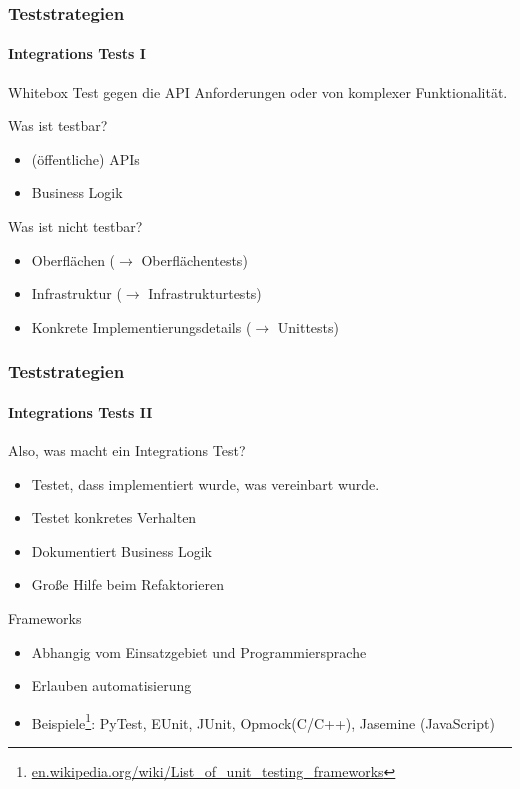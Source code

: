 \begin{frame}
  \frametitle{Teststrategien}
  \framesubtitle{Integrations Tests I}
  Whitebox Test gegen die API Anforderungen oder von komplexer Funktionalität.
  \pause
  \begin{block}{Was ist testbar?}
    \pause
    \begin{itemize}
    \item (öffentliche) APIs
      \pause
    \item Business Logik
      \pause
    \end{itemize}
  \end{block}

  \pause
  \begin{block}{Was ist nicht testbar?}
    \pause
    \begin{itemize}
      \item Oberflächen ($\rightarrow$ Oberflächentests)
        \pause
      \item Infrastruktur ($\rightarrow$ Infrastrukturtests)
        \pause
      \item Konkrete Implementierungsdetails ($\rightarrow$ Unittests)
    \end{itemize}
  \end{block}
\end{frame}

\begin{frame}
  \frametitle{Teststrategien}
  \framesubtitle{Integrations Tests II}

  \begin{block}{Also, was macht ein Integrations Test?}
    \pause
    \begin{itemize}
      \item Testet, dass implementiert wurde, was vereinbart wurde.
        \pause
      \item Testet konkretes Verhalten
        \pause
      \item Dokumentiert Business Logik
        \pause
      \item Große Hilfe beim Refaktorieren
    \end{itemize}
  \end{block}

  \pause

  \begin{block}{Frameworks}
    \pause
    \begin{itemize}
      \item Abhangig vom Einsatzgebiet und Programmiersprache
        \pause
      \item Erlauben automatisierung
        \pause
      \item Beispiele\footnote{\url{en.wikipedia.org/wiki/List\_of\_unit\_testing\_frameworks}}:
        PyTest, EUnit, JUnit, Opmock(C/C++), Jasemine (JavaScript)
    \end{itemize}
  \end{block}

\end{frame}
